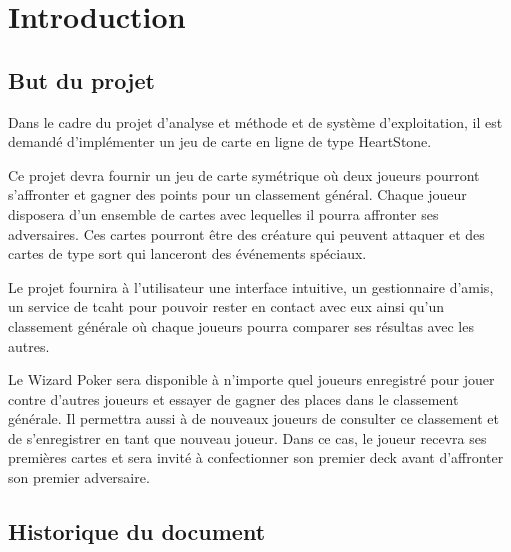 \documentclass[11pt,a4paper]{article}
\begin{document}

\pagestyle{empty}
\tableofcontents
\newpage
\pagestyle{fancy}

\setcounter{page}{1}

\section{Introduction}
\label{sec:intro}

\subsection{But du projet}
\label{sec:but}

Dans le cadre du projet d'analyse et méthode et de système
d'exploitation, il est demandé d'implémenter un jeu de carte en ligne
de type HeartStone.

\medbreak

Ce projet devra fournir un jeu de carte symétrique où deux joueurs
pourront s'affronter et gagner des points pour un classement
général. Chaque joueur disposera d'un ensemble de cartes avec lequelles
il pourra affronter ses adversaires. Ces cartes pourront être des
créature qui peuvent attaquer et des cartes de type
sort qui lanceront des événements spéciaux.

\medbreak

Le projet fournira à l'utilisateur une interface intuitive, un gestionnaire
d'amis, un service de tcaht pour pouvoir rester en contact avec eux ainsi
qu'un classement générale où chaque joueurs pourra comparer ses résultas avec
les autres.

\medbreak

Le Wizard Poker sera disponible à n'importe quel joueurs enregistré
pour jouer contre d'autres joueurs et essayer de gagner des places
dans le classement générale. Il permettra aussi à de nouveaux joueurs
de consulter ce classement et de s'enregistrer en tant que nouveau
joueur. Dans ce cas, le joueur recevra ses premières cartes et sera
invité à confectionner son premier deck avant d'affronter son premier
adversaire.

\subsection{Historique du document}
\label{sec:hist}
\end{document}
